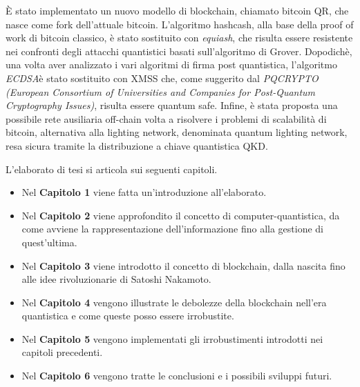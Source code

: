 È stato implementato un nuovo modello di blockchain, chiamato bitcoin QR, che nasce come fork dell'attuale bitcoin. L'algoritmo hashcash, alla base della proof of work di bitcoin classico, è stato sostituito con \textit{equiash}, che risulta essere resistente nei confronti degli attacchi quantistici basati sull'algoritmo di Grover. Dopodichè, una volta aver analizzato i vari algoritmi di firma post quantistica, l'algoritmo \textit{ECDSA}\footnotemark[2] è stato sostituito con XMSS che, come suggerito dal \textit{PQCRYPTO (European Consortium of Universities and Companies for Post-Quantum Cryptography Issues)}, risulta essere quantum safe. Infine, è stata proposta una possibile rete ausiliaria off-chain volta a risolvere i problemi di scalabilità di bitcoin, alternativa alla lighting network, denominata quantum lighting network, resa sicura tramite la distribuzione a chiave quantistica QKD.

L'elaborato di tesi si articola sui seguenti capitoli.
\begin{itemize}
  \item Nel \textbf{Capitolo 1} viene fatta un'introduzione all'elaborato.
  \item Nel \textbf{Capitolo 2} viene approfondito il concetto di computer-quantistica, da come avviene la rappresentazione dell'informazione fino alla gestione di quest'ultima.
  \item Nel \textbf{Capitolo 3} viene introdotto il concetto di blockchain, dalla nascita fino alle idee rivoluzionarie di Satoshi Nakamoto.
  \item Nel \textbf{Capitolo 4} vengono illustrate le debolezze della blockchain nell'era quantistica e come queste posso essere irrobustite.
  \item Nel \textbf{Capitolo 5} vengono implementati gli irrobustimenti introdotti nei capitoli precedenti.
  \item Nel \textbf{Capitolo 6} vengono tratte le conclusioni e i possibili sviluppi futuri.
\end{itemize}